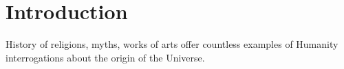 
\chapter*{Introduction} %


\label{Introduction} %



History of religions, myths, works of arts offer countless examples of Humanity interrogations about the origin of the Universe.


